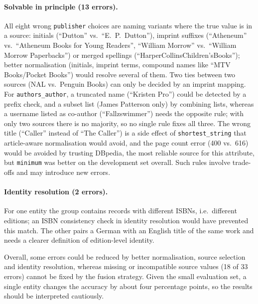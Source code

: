 \documentclass[a4paper,11pt]{article}
\begin{document}
\paragraph{Solvable in principle (13 errors).}
All eight wrong \texttt{publisher} choices are naming variants where the true
value is in a source: initials (``Dutton'' vs.\ ``E.\ P.\ Dutton''), imprint
suffixes (``Atheneum'' vs.\ ``Atheneum Books for Young Readers'', ``William
Morrow'' vs.\ ``William Morrow Paperbacks'') or merged spellings
(``HarperCollinsChildren'sBooks''); better normalisation (initials, imprint terms,
compound names like ``MTV Books/Pocket Books'') would resolve several of them.
Two ties between two sources (NAL vs.\ Penguin Books) can only be decided by an
imprint mapping. For \texttt{authors\_author}, a truncated name (``Kristen Pro'')
could be detected by a prefix check, and a subset list (James Patterson only)
by combining lists, whereas a username listed as co-author (``Fallzswimmer'') needs
the opposite rule; with only two sources there is no majority, so no single
rule fixes all three. The wrong title (``Caller'' instead of ``The Caller'') is a
side effect of \texttt{shortest\_string} that article-aware normalisation would
avoid, and the page count error (400 vs.\ 616) would be avoided by trusting DBpedia,
the most reliable source for this attribute, but \texttt{minimum} was better on the
development set overall. Such rules involve trade-offs and may introduce new errors.

\paragraph{Identity resolution (2 errors).}
For one entity the group contains records with different ISBNs, i.e.\ different
editions; an ISBN consistency check in identity resolution would have prevented
this match. The other pairs a German with an English title of the same work and
needs a clearer definition of edition-level identity.

Overall, some errors could be reduced by better normalisation, source selection
and identity resolution, whereas missing or incompatible source values (18 of 33
errors) cannot be fixed by the fusion strategy. Given the small evaluation set,
a single entity changes the accuracy by about four percentage points, so the
results should be interpreted cautiously.
\end{document}
